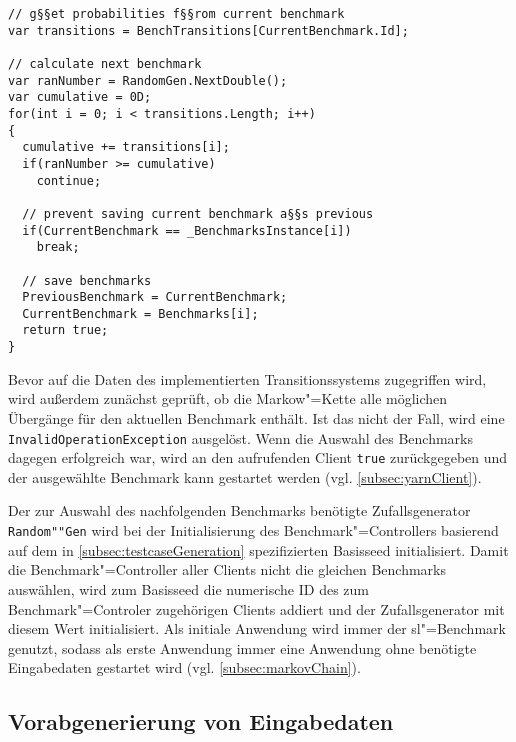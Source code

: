\begin{lstlisting}[label=lst:benchmarkChanging,style=cs,
caption={[Auswahl des nachfolgenden Benchmarks]
    Auswahl des nachfolgenden Benchmarks (gekürzt).
    Dies stellt einen Ausschnitt der Methode \texttt{ChangeBenchmark()} dar, welche vom Client zur Bestimmung des nachfolgenden Benchmarks aufgerufen wird (vgl. \cref{subsec:yarnClient}).}]
// g§§et probabilities f§§rom current benchmark
var transitions = BenchTransitions[CurrentBenchmark.Id];

// calculate next benchmark
var ranNumber = RandomGen.NextDouble();
var cumulative = 0D;
for(int i = 0; i < transitions.Length; i++)
{
  cumulative += transitions[i];
  if(ranNumber >= cumulative)
    continue;
  
  // prevent saving current benchmark a§§s previous
  if(CurrentBenchmark == _BenchmarksInstance[i])
    break;
  
  // save benchmarks
  PreviousBenchmark = CurrentBenchmark;
  CurrentBenchmark = Benchmarks[i];
  return true;
}
\end{lstlisting}

Bevor auf die Daten des implementierten Transitionssystems zugegriffen wird, wird außerdem zunächst geprüft, ob die Markow"=Kette alle möglichen Übergänge für den aktuellen Benchmark enthält.
Ist das nicht der Fall, wird eine \texttt{InvalidOperationException} ausgelöst.
Wenn die Auswahl des Benchmarks dagegen erfolgreich war, wird an den aufrufenden Client \texttt{true} zurückgegeben und der ausgewählte Benchmark kann gestartet werden (vgl. \cref{subsec:yarnClient}).

Der zur Auswahl des nachfolgenden Benchmarks benötigte Zufallsgenerator \texttt{Random""Gen} wird bei der Initialisierung des Benchmark"=Controllers basierend auf dem in \cref{subsec:testcaseGeneration} spezifizierten Basisseed initialisiert.
Damit die Benchmark"=Controller aller Clients nicht die gleichen Benchmarks auswählen, wird zum Basisseed die numerische ID des zum Benchmark"=Controler zugehörigen Clients addiert und der Zufallsgenerator mit diesem Wert initialisiert.
Als initiale Anwendung wird immer der \acrlong{sl}"=Benchmark genutzt, sodass als erste Anwendung immer eine Anwendung ohne benötigte Eingabedaten gestartet wird (vgl. \cref{subsec:markovChain}).

\subsection{Vorabgenerierung von Eingabedaten}
\label{subsec:precreateInputData}

